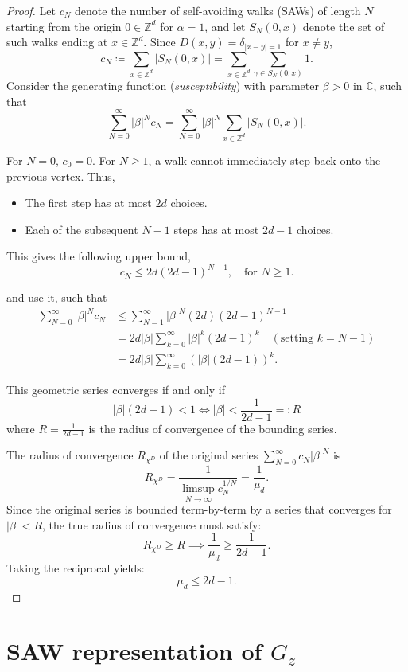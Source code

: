 \documentclass[11pt, a4paper, UKenglish, oneside]{book}
\theoremstyle{plain}
\theoremstyle{remark}
\theoremstyle{definition}
\numberwithin{equation}{section}
\numberwithin{theorem}{section}
\begin{document}
\begin{proof}
Let $c_N$ denote the number of self-avoiding walks (SAWs) of length $N$ starting from the origin $0 \in \mathbb{Z}^d$ for $\alpha=1$, and let $S_N(0, x)$ denote the set of such walks ending at $x \in \mathbb{Z}^d$. Since $D(x,y)= \delta_{|x-y|=1}$ for $x \ne y$,
\[
c_N \coloneqq \sum_{x \in \mathbb{Z}^d} |S_N(0, x)| = \sum_{x \in \mathbb{Z}^d} \sum_{\gamma \in S_N(0, x)} 1.
\]
Consider the generating function (\textit{susceptibility}) with parameter $\beta >0$ in $\mathbb{C}$, such that
\[
\sum_{N=0}^{\infty} |\beta|^N c_N = \sum_{N=0}^{\infty} |\beta|^N \sum_{x \in \mathbb{Z}^d} |S_N(0, x)|.
\]

For $N = 0$, $c_0 = 0$. For $N \ge 1$, a walk cannot immediately step back onto the previous vertex. Thus,
\begin{itemize}
    \item The first step has at most $2d$ choices.
    \item Each of the subsequent $N-1$ steps has at most $2d - 1$ choices.
\end{itemize}
This gives the following upper bound,
\[
c_N \le 2d (2d - 1)^{N-1}, \quad \text{for } N \ge 1.
\]

and use it, such that
\begin{align*}
\sum_{N=0}^{\infty} |\beta|^N c_N
&\le \sum_{N=1}^{\infty} |\beta|^N (2d)(2d-1)^{N-1} \\
&= 2d |\beta| \sum_{k=0}^{\infty} |\beta|^k (2d-1)^k \quad (\text{setting } k = N-1) \\
&= 2d |\beta| \sum_{k=0}^{\infty} \left(|\beta|(2d-1)\right)^k.
\end{align*}

This geometric series converges if and only if
\[
|\beta|(2d - 1) < 1 \iff |\beta| < \frac{1}{2d - 1} =: R
\]
where $R = \frac{1}{2d - 1}$ is the radius of convergence of the bounding series.

The radius of convergence $R_{\chi^D}$ of the original series $\sum_{N=0}^{\infty} c_N|\beta|^N$ is
\[
R_{\chi^D} = \frac{1}{\limsup_{N \to \infty} c_N^{1/N}} = \frac{1}{\mu_d}.
\]
Since the original series is bounded term-by-term by a series that converges for $|\beta| < R$, the true radius of convergence must satisfy:
\[
R_{\chi^D} \ge R \implies \frac{1}{\mu_d} \ge \frac{1}{2d - 1}.
\]
Taking the reciprocal yields:
\[
\mu_d \le 2d - 1.
\]
\end{proof}

\section{SAW representation of $G_z$ }
\end{document}

